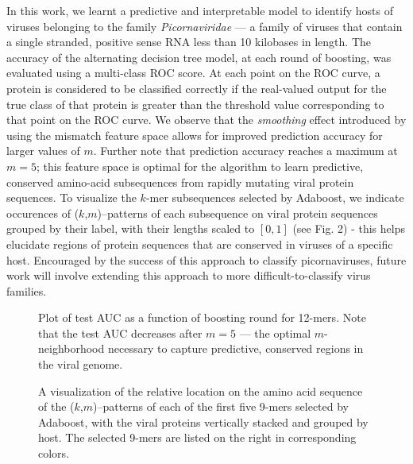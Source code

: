 In this work, we learnt a predictive and interpretable model to identify hosts of viruses 
belonging to the family \emph{Picornaviridae} --- a family of viruses that contain a single 
stranded, positive sense RNA less than 10 kilobases in length. The accuracy of the alternating 
decision tree model, at each round of boosting, was evaluated using a multi-class ROC score.
At each point on the ROC curve, a protein is considered to be classified correctly if the 
real-valued output for the true class of that protein is greater than the threshold value
corresponding to that point on the ROC curve. We observe that the \emph{smoothing} effect introduced
by using the mismatch feature space allows for improved prediction accuracy for larger
values of $m$. Further note that prediction accuracy reaches a maximum at $m=5$; this feature space is
optimal for the algorithm to learn predictive, conserved amino-acid subsequences from rapidly 
mutating viral protein sequences. To visualize the $k$-mer subsequences selected by 
Adaboost, we indicate occurences of ($k$,$m$)--patterns of each subsequence on viral protein 
sequences grouped by their label, with their lengths scaled to $[0,1]$ (see Fig. 2) - this helps 
elucidate regions of protein sequences that are conserved in viruses of a specific host. Encouraged 
by the success of this approach to classify picornaviruses, future work will involve extending 
this approach to more difficult-to-classify virus families.

\begin{figure}
\begin{minipage}[t]{0.5\linewidth}
\caption{\small{Plot of test AUC as a function of boosting round for 12-mers. Note that the test AUC decreases
after $m=5$ --- the optimal $m$-neighborhood necessary to capture predictive, conserved regions
in the viral genome.}}
\label{auc}
\end{minipage}\quad
\begin{minipage}[t]{0.5\linewidth}
\caption{\small{A visualization of the relative location on the amino acid sequence of the 
($k$,$m$)--patterns of each of the first five 9-mers selected by Adaboost, with the viral proteins
vertically stacked and grouped by host. The selected 9-mers are listed on the right in corresponding colors.}}
\label{kmers}
\end{minipage}
\end{figure}


